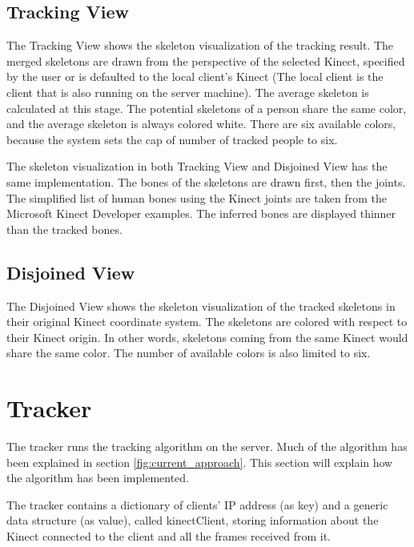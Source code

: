 \subsection{Tracking View}
\label{sec:implementation_tracking_view}

The Tracking View shows the skeleton visualization of the tracking result. The merged skeletons are drawn from the perspective of the selected Kinect, specified by the user or is defaulted to the local client's Kinect (The local client is the client that is also running on the server machine). The average skeleton is calculated at this stage. The potential skeletons of a person share the same color, and the average skeleton is always colored white. There are six available colors, because the system sets the cap of number of tracked people to six.

The skeleton visualization in both Tracking View and Disjoined View has the same implementation. The bones of the skeletons are drawn first, then the joints. The simplified list of human bones using the Kinect joints are taken from the Microsoft Kinect Developer examples. The inferred bones are displayed thinner than the tracked bones.

\subsection{Disjoined View}
\label{sec:implementation_disjoined_view}

The Disjoined View shows the skeleton visualization of the tracked skeletons in their original Kinect coordinate system. The skeletons are colored with respect to their Kinect origin. In other words, skeletons coming from the same Kinect would share the same color. The number of available colors is also limited to six.

\section{Tracker}
\label{sec:implementation_tracker}

The tracker runs the tracking algorithm on the server. Much of the algorithm has been explained in section \ref{fig:current_approach}. This section will explain how the algorithm has been implemented.

The tracker contains a dictionary of clients' IP address (as key) and a generic data structure (as value), called kinectClient, storing information about the Kinect connected to the client and all the frames received from it.

